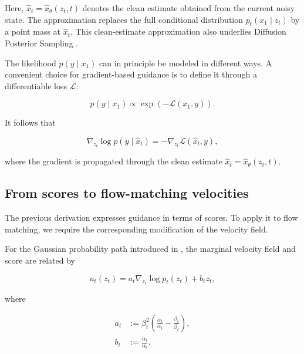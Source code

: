 Here, $\hat{x}_t=\hat{x}_\theta(z_t,t)$ denotes the clean estimate obtained
from the current noisy state. The approximation replaces the full conditional
distribution $p_t(x_1\mid z_t)$ by a point mass at $\hat{x}_t$. This
clean-estimate approximation also underlies Diffusion Posterior Sampling
\parencite{chung2023diffusion}.

The likelihood $p(y\mid x_1)$ can in principle be modeled in different ways.
A convenient choice for gradient-based guidance is to define it through a
differentiable loss $\mathcal{L}$:

\begin{equation}
    p(y\mid x_1)
    \propto
    \exp\left(
        -\mathcal{L}(x_1,y)
    \right).
    \label{eq:energy-likelihood}
\end{equation}

It follows that

\begin{equation}
    \nabla_{z_t}\log p(y\mid\hat{x}_t)
    =
    -
    \nabla_{z_t}\mathcal{L}(\hat{x}_t,y),
    \label{eq:likelihood-loss}
\end{equation}

where the gradient is propagated through the clean estimate
$\hat{x}_t=\hat{x}_\theta(z_t,t)$.

\subsection{From scores to flow-matching velocities}

The previous derivation expresses guidance in terms of scores.
To apply it to flow matching, we require the corresponding modification of the
velocity field.

For the Gaussian probability path introduced in
, the marginal velocity field and score are
related by \parencite{flowsanddiffusions2026}

\begin{equation}
    u_t(z_t)
    =
    a_t
    \nabla_{z_t}\log p_t(z_t)
    +
    b_t z_t,
    \label{eq:score-velocity-relation}
\end{equation}

where

\begin{align}
    a_t
    &:=
    \beta_t^2
    \left(
        \frac{\dot{\alpha}_t}{\alpha_t}
        -
        \frac{\dot{\beta}_t}{\beta_t}
    \right),
    \\
    b_t
    &:=
    \frac{\dot{\alpha}_t}{\alpha_t}.
\end{align}

